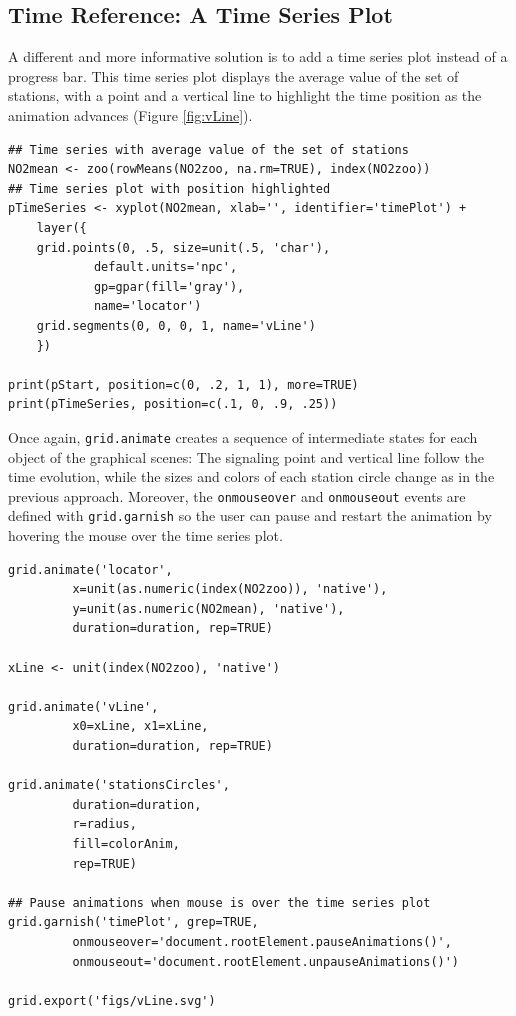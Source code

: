 \documentclass[smallroyalvopaper]{memoir}
\begin{document}
\subsection{Time Reference: A Time Series Plot}
\label{sec-4-4}
A different and more informative solution is to add a time series
plot instead of a progress bar.  This time series plot displays
the average value of the set of stations, with a point and a
vertical line to highlight the time position as the animation
advances (Figure \ref{fig:vLine}).
\lstset{language=R,numbers=none}
\begin{lstlisting}
## Time series with average value of the set of stations
NO2mean <- zoo(rowMeans(NO2zoo, na.rm=TRUE), index(NO2zoo))
## Time series plot with position highlighted
pTimeSeries <- xyplot(NO2mean, xlab='', identifier='timePlot') +
    layer({
	grid.points(0, .5, size=unit(.5, 'char'),
		    default.units='npc',
		    gp=gpar(fill='gray'),
		    name='locator')
	grid.segments(0, 0, 0, 1, name='vLine')
    })

print(pStart, position=c(0, .2, 1, 1), more=TRUE)
print(pTimeSeries, position=c(.1, 0, .9, .25))
\end{lstlisting}


Once again, \texttt{grid.animate} creates a sequence of intermediate states
for each object of the graphical scenes: The signaling point and
vertical line follow the time evolution, while the sizes and colors of
each station circle change as in the previous approach.  Moreover, the
\texttt{onmouseover} and \texttt{onmouseout} events are defined with \texttt{grid.garnish}
so the user can pause and restart the animation by hovering the mouse
over the time series plot.
\lstset{language=R,numbers=none}
\begin{lstlisting}
grid.animate('locator',
	     x=unit(as.numeric(index(NO2zoo)), 'native'),
	     y=unit(as.numeric(NO2mean), 'native'),
	     duration=duration, rep=TRUE)

xLine <- unit(index(NO2zoo), 'native')

grid.animate('vLine',
	     x0=xLine, x1=xLine,
	     duration=duration, rep=TRUE)

grid.animate('stationsCircles',
	     duration=duration,
	     r=radius,
	     fill=colorAnim,
	     rep=TRUE)

## Pause animations when mouse is over the time series plot
grid.garnish('timePlot', grep=TRUE,
	     onmouseover='document.rootElement.pauseAnimations()',
	     onmouseout='document.rootElement.unpauseAnimations()')

grid.export('figs/vLine.svg')
\end{lstlisting}
\end{document}
